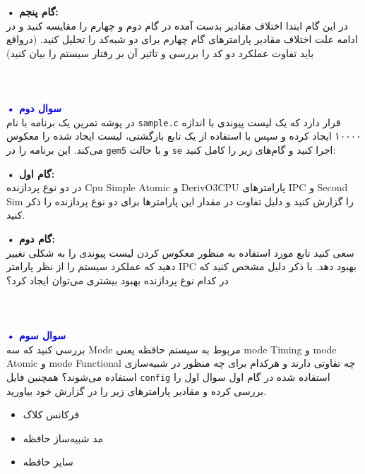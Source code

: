 \documentclass[12pt]{exam}
\begin{document}
\textbf{• گام پنجم: }\\
در این گام ابتدا اختلاف مقادیر بدست آمده در گام دوم و چهارم را مقایسه کنید و در ادامه علت اختلاف مقادیر پارامتر‌های گام چهارم برای دو شبه‌کد را تحلیل کنید. (درواقع باید تفاوت عملکرد دو کد را بررسی و تاثیر آن بر رفتار سیستم را بیان کنید) \\ \\ \\ \\








\textbf{\textcolor{blue}{• سوال دوم}} \\ 
در پوشه تمرین یک برنامه با نام \texttt{sample.c} قرار دارد که یک لیست پیوندی با اندازه ۱۰۰۰۰ ایجاد کرده و سپس با استفاده از یک تابع بازگشتی، لیست ایجاد شده را معکوس می‌کند. این برنامه را در \texttt{gem5} و با حالت \texttt{se} اجرا کنید و گام‌های زیر را کامل کنید:



\textbf{• گام اول: }\\
در دو نوع پردازنده Cpu Simple Atomic و DerivO3CPU پارامتر‌های IPC و Second Sim را گزارش کنید و دلیل تفاوت در مقدار این پارامتر‌ها برای دو نوع پردازنده را ذکر کنید.



\textbf{• گام دوم: }\\
سعی کنید تابع مورد استفاده به منظور معکوس کردن لیست پیوندی را به شکلی تغییر دهید که عملکرد سیستم را از نظر پارامتر IPC بهبود دهد. با ذکر دلیل مشخص کنید که در کدام نوع پردازنده بهبود بیشتری می‌توان ایجاد کرد؟ \\ \\ \\ \\









\textbf{\textcolor{blue}{• سوال سوم}} \\ 
بررسی کنید که سه Mode مربوط به سیستم حافظه یعنی mode Timing و mode Atomic و mode Functional چه تفاوتی دارند و هرکدام برای چه منظور در شبیه‌سازی استفاده می‌شوند؟ همچنین فایل \texttt{config} استفاده شده در گام اول سوال اول را بررسی کرده و مقادیر پارامتر‌های زیر را در گزارش خود بیاورید.

\begin{itemize}
	\item فرکانس کلاک
	\item مد شبیه‌ساز حافظه
	\item سایز حافظه
\end{itemize}
\end{document}
